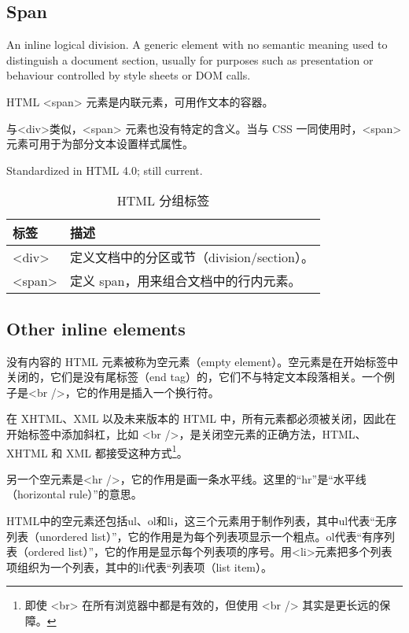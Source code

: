 \subsection{Span}

An inline logical division. A generic element with no semantic meaning used to distinguish a document section, usually for purposes such as presentation or behaviour controlled by style sheets or DOM calls.

HTML <span> 元素是内联元素，可用作文本的容器。

与<div>类似，<span> 元素也没有特定的含义。当与 CSS 一同使用时，<span> 元素可用于为部分文本设置样式属性。



Standardized in HTML 4.0; still current.


\begin{table}
\centering
\caption{HTML 分组标签}
\begin{tabular}{|l|l|}
\hline
标签		&描述\\
\hline
<div>	&定义文档中的分区或节（division/section）。\\
\hline
<span>	&定义 span，用来组合文档中的行内元素。\\
\hline
\end{tabular}
\end{table}




\subsection{Other inline elements}

没有内容的 HTML 元素被称为空元素（empty element）。空元素是在开始标签中关闭的，它们是没有尾标签（end tag）的，它们不与特定文本段落相关。一个例子是<br />，它的作用是插入一个换行符。

在 XHTML、XML 以及未来版本的 HTML 中，所有元素都必须被关闭，因此在开始标签中添加斜杠，比如 <br />，是关闭空元素的正确方法，HTML、XHTML 和 XML 都接受这种方式\footnote{即使 <br> 在所有浏览器中都是有效的，但使用 <br /> 其实是更长远的保障。}。

另一个空元素是<hr />，它的作用是画一条水平线。这里的“hr”是“水平线（horizontal rule）”的意思。

HTML中的空元素还包括ul、ol和li，这三个元素用于制作列表，其中ul代表“无序列表（unordered list）”，它的作用是为每个列表项显示一个粗点。ol代表“有序列表（ordered list）”，它的作用是显示每个列表项的序号。用<li>元素把多个列表项组织为一个列表，其中的li代表“列表项（list item）。

